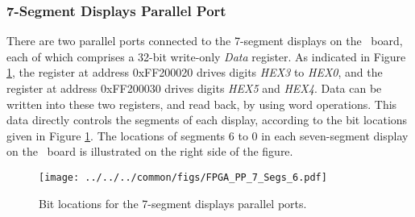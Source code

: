 \subsubsection{7-Segment Displays Parallel Port}

There are two parallel ports connected to the 7-segment displays on the \DEBoard~board, each of
which comprises a 32-bit write-only {\it Data} register. As indicated in 
Figure \ref{fig:hex_segment_port}, the register at address {\sf 0xFF200020} 
drives digits {\it HEX3} to {\it HEX0}, and the register at 
address {\sf 0xFF200030} drives digits {\it HEX5} and
{\it HEX4}.  Data can be written into these two registers, and read back, by using word operations. 
This data directly controls the segments of each display, according to
the bit locations given in Figure \ref{fig:hex_segment_port}. The locations of segments 
6 to 0 in each seven-segment display on the \DEBoard~board is illustrated on the right side of the
figure.

\begin{figure}[h!]
   \begin{center}
       \texttt{[image: ../../../common/figs/FPGA\_PP\_7\_Segs\_6.pdf]}
   \end{center}
   \caption{Bit locations for the 7-segment displays parallel ports.}
	\label{fig:hex_segment_port}
\end{figure}

